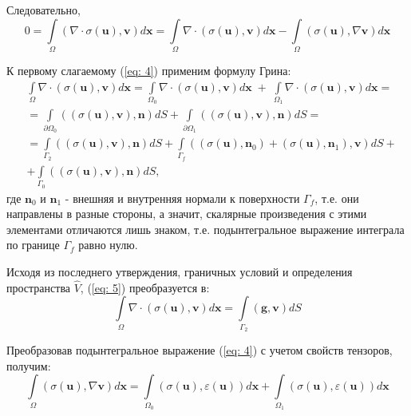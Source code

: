 \documentclass[a4paper, 14pt]{extreport}
\begin{document}
Следовательно,
\begin{equation}
	\label{eq: 4}
	0 = \int\limits_\Omega{(\nabla\!\cdot\!\sigma(\textbf{u}), \textbf{v})}d\textbf{x} = 
		\int\limits_\Omega{\nabla\!\cdot\!(\sigma(\textbf{u}), \textbf{v})}d\textbf{x} - 
		\int\limits_\Omega{(\sigma(\textbf{u}), \nabla \textbf{v})}d\textbf{x}
\end{equation}

К первому слагаемому (\ref{eq: 4}) применим формулу Грина:
\begin{equation}
	\label{eq: 5}
	\begin{aligned}
		& \int\limits_\Omega{\nabla\!\cdot\!(\sigma(\textbf{u}), \textbf{v})}d\textbf{x} = 
		\int\limits_{\Omega_0}{\nabla\!\cdot\!(\sigma(\textbf{u}), \textbf{v})}d\textbf{x} \; +  \;
		\int\limits_{\Omega_1}{\nabla\!\cdot\!(\sigma(\textbf{u}), \textbf{v})}d\textbf{x} = \\
		& = \int\limits_{\partial\Omega_0}{((\sigma(\textbf{u}), \textbf{v}), \textbf{n})}dS + 
		\int\limits_{\partial\Omega_1}{((\sigma(\textbf{u}), \textbf{v}), \textbf{n})}dS = \\
		& = \int\limits_{\Gamma_2}{((\sigma(\textbf{u}), \textbf{v}), \textbf{n})}dS + 
		\int\limits_{\Gamma_f}{((\sigma(\textbf{u}), \textbf{n}_0) + (\sigma(\textbf{u}), \textbf{n}_1), \textbf{v})}dS + \\
		& + \int\limits_{\Gamma_0}{((\sigma(\textbf{u}), \textbf{v}), \textbf{n})}dS,
	\end{aligned}
\end{equation}
где $\textbf{n}_0$ и $\textbf{n}_1$ - внешняя и внутренняя нормали к поверхности $\Gamma_f$,
т.е. они направлены в разные стороны, а значит, скалярные произведения с этими элементами 
отличаются лишь знаком, т.е. подынтегральное выражение интеграла по границе $\Gamma_f$ 
равно нулю.

Исходя из последнего утверждения, граничных условий и определения пространства $\hat{V}$,
(\ref{eq: 5}) преобразуется в:
\begin{equation}
	\label{eq: 6}
	\int\limits_\Omega{\nabla\!\cdot\!(\sigma(\textbf{u}), \textbf{v})}d\textbf{x} = 
	\int\limits_{\Gamma_2}{(\textbf{g}, \textbf{v})}dS
\end{equation}

Преобразовав подынтегральное выражение (\ref{eq: 4}) с учетом свойств тензоров, получим:
\begin{equation}
	\label{eq: 7}
	\int\limits_\Omega{(\sigma(\textbf{u}), \nabla \textbf{v})}d\textbf{x} = 
	\int\limits_{\Omega_0}{(\sigma(\textbf{u}), \varepsilon(\textbf{u}))}d\textbf{x} + 
	\int\limits_{\Omega_1}{(\sigma(\textbf{u}), \varepsilon(\textbf{u}))}d\textbf{x}
\end{equation}
\end{document}
